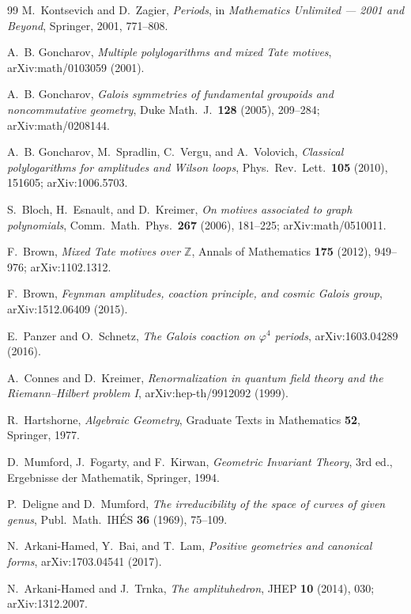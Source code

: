 \documentclass[12pt]{article}
\theoremstyle{definition}
\theoremstyle{remark}
\begin{document}
\begin{thebibliography}{99}
 M.~Kontsevich and D.~Zagier, \emph{Periods}, in
\emph{Mathematics Unlimited --- 2001 and Beyond}, Springer, 2001, 771--808.

 A.~B. Goncharov, \emph{Multiple polylogarithms and mixed Tate
motives}, arXiv:math/0103059 (2001).

 A.~B. Goncharov, \emph{Galois symmetries of fundamental
groupoids and noncommutative geometry}, Duke Math.\ J.\ \textbf{128} (2005), 209--284;
arXiv:math/0208144.

 A.~B. Goncharov, M.~Spradlin, C.~Vergu, and A.~Volovich,
\emph{Classical polylogarithms for amplitudes and Wilson loops}, Phys.\ Rev.\ Lett.\
\textbf{105} (2010), 151605; arXiv:1006.5703.

 S.~Bloch, H.~Esnault, and D.~Kreimer, \emph{On motives associated to
graph polynomials}, Comm.\ Math.\ Phys.\ \textbf{267} (2006), 181--225;
arXiv:math/0510011.

 F.~Brown, \emph{Mixed Tate motives over $\mathbb Z$}, Annals of
Mathematics \textbf{175} (2012), 949--976; arXiv:1102.1312.

 F.~Brown, \emph{Feynman amplitudes, coaction principle, and
cosmic Galois group}, arXiv:1512.06409 (2015).

 E.~Panzer and O.~Schnetz, \emph{The Galois coaction on
$\varphi^4$ periods}, arXiv:1603.04289 (2016).

 A.~Connes and D.~Kreimer, \emph{Renormalization in quantum
field theory and the Riemann--Hilbert problem I}, arXiv:hep-th/9912092 (1999).

 R.~Hartshorne, \emph{Algebraic Geometry}, Graduate Texts in
Mathematics \textbf{52}, Springer, 1977.

 D.~Mumford, J.~Fogarty, and F.~Kirwan, \emph{Geometric
Invariant Theory}, 3rd ed., Ergebnisse der Mathematik, Springer, 1994.

 P.~Deligne and D.~Mumford, \emph{The irreducibility of
the space of curves of given genus}, Publ.\ Math.\ IH\'ES \textbf{36} (1969), 75--109.

 N.~Arkani-Hamed, Y.~Bai, and T.~Lam, \emph{Positive geometries and
canonical forms}, arXiv:1703.04541 (2017).

 N.~Arkani-Hamed and J.~Trnka, \emph{The amplituhedron},
JHEP \textbf{10} (2014), 030; arXiv:1312.2007.


\end{thebibliography}
\end{document}
